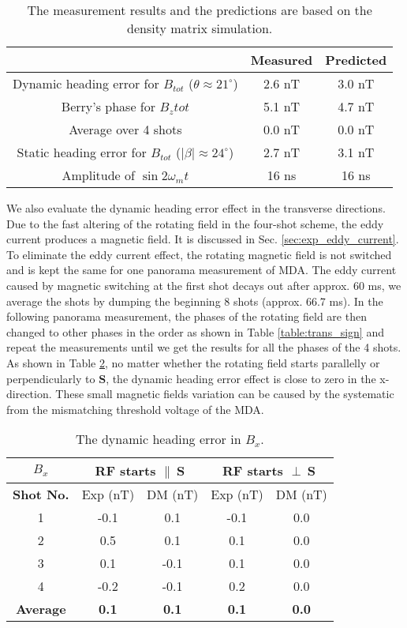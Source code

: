 \documentclass[prx,twocolumn,10pt,nofootinbib]{revtex4-1}
\begin{document}
\begin{table}[]
\begin{tabular}{|c|c|c|}
\hline
                                & Measured & Predicted \\ \hline
Dynamic heading error for $B_{tot}$ ($\theta \approx 21^{\circ}$) & 2.6 nT   & 3.0 nT    \\ \hline
Berry’s phase for $B_z{tot}$         & 5.1 nT   & 4.7 nT    \\ \hline
Average over 4 shots            & 0.0 nT   & 0.0 nT    \\ \hline
Static heading error for $B_{tot}$ ($|\beta| \approx 24^{\circ}$)  & 2.7 nT  & 3.1 nT    \\ \hline
Amplitude of $\sin 2 \omega_m t$ & 16 ns   & 16 ns   \\ \hline
\end{tabular}
\caption{The measurement results and the predictions are based on the density matrix simulation.}
\label{table:heading_error}
\end{table}

We also evaluate the dynamic heading error effect in the transverse directions. Due to the fast altering of the rotating field in the four-shot scheme, the eddy current produces a magnetic field. It is discussed in Sec. \ref{sec:exp_eddy_current}. To eliminate the eddy current effect, the rotating magnetic field is not switched and is kept the same for one panorama measurement of MDA. The eddy current caused by magnetic switching at the first shot decays out after approx. 60 ms, we average the shots by dumping the beginning 8 shots (approx. 66.7 ms). In the following panorama measurement, the phases of the rotating field are then changed to other phases in the order as shown in Table \ref{table:trans_sign} and repeat the measurements until we get the results for all the phases of the 4 shots. As shown in Table \ref{table:bx_HE}, no matter whether the rotating field starts parallelly or perpendicularly to $\bm{S}$, the dynamic heading error effect is close to zero in the x-direction. These small magnetic fields variation can be caused by the systematic from the mismatching threshold voltage of the MDA. 

\begin{table}
\centering
\begin{tabular}{|c|c|c|c|c|}
\hline
$B_x$ & \multicolumn{2}{c|}{RF starts $\parallel~\bm{S}$} & \multicolumn{2}{c|}{RF starts $\perp~\bm{S}$} \\ \hline
\textbf{Shot No.} & Exp (nT) & DM (nT) & Exp (nT) & DM (nT) \\ \hline
1 & -0.1 & 0.1 & -0.1 & 0.0 \\ \hline
2 & 0.5 & 0.1 & 0.1 & 0.0 \\ \hline
3 & 0.1 & -0.1 & 0.1 & 0.0 \\ \hline
4 & -0.2 & -0.1 & 0.2 & 0.0 \\ \hline
\textbf{Average} & \textbf{0.1} & \textbf{0.1} & \textbf{0.1} & \textbf{0.0} \\ \hline
\end{tabular}
\caption{The dynamic heading error in $B_x$.}
\label{table:bx_HE}
\end{table}
\end{document}
